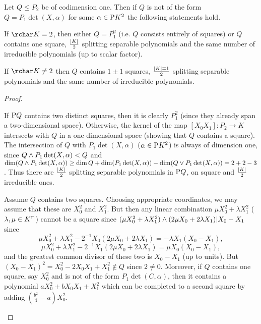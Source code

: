 \begin{lemma}
    Let $Q\leq P_2$ be of codimension one. Then if $Q$ is not of the form $Q=P_1\det(X,\alpha)$ for some $\alpha\in\P K^2$ the following statements hold.
    \begin{statements}
            \item If $\rchar K = 2$, then either $Q=P_1^2$ (i.e. $Q$ consists entirely of squares) or $Q$ contains one square, $\frac{\left\vert{K}\right\vert} 2$ splitting separable polynomials and the same number of irreducible polynomials (up to scalar factor).
        \item If $\rchar K \neq 2$ then $Q$ contains $1\pm 1$ squares, $\frac{\left\vert{K}\right\vert \mp 1} 2$ splitting separable polynomials and the same number of irreducible polynomials.
    \end{statements}
\end{lemma}

\begin{proof}
    \begin{statements}
            \item If $\P Q$ contains two distinct squares, then it is clearly $P_1^2$ (since they already span a two-dimensional space). Otherwise, the kernel of the map $[X_0X_1]:P_2\to K$ intersects with $Q$ in a one-dimensional space (showing that $Q$ contains a square). The intersection of $Q$ with $P_1\det(X,\alpha)$ ($\alpha\in \P K^2$) is always of dimension one, since $Q\wedge P_1\det(X,\alpha)<Q$ and $\dim (Q\wedge P_1\det(X,\alpha))\geq \dim Q+\dim (P_1\det(X,\alpha))-\dim (Q\vee P_1\det(X,\alpha))=2+2-3$. Thus there are $\frac{\left\vert{K}\right\vert} 2$ splitting separable polynomials in $\P Q$, on square and $\frac{\left\vert{K}\right\vert} 2$ irreducible ones.
            \item Assume $Q$ contains two squares. Choosing appropriate coordinates, we may assume that these are $X_0^2$ and $X_1^2$. But then any linear combination $\mu X_0^2+\lambda X_1^2$ ($\lambda,\mu\in\units K$) cannot be a square since $(\mu X_0^2+\lambda X_1^2)\wedge (2\mu X_0+2\lambda X_1)| X_0-X_1$ since
        $$
        \mu X_0^2+\lambda X_1^2-2^{-1}X_0(2\mu X_0+2\lambda X_1)=-\lambda X_1(X_0-X_1),
        $$
        $$
        \mu X_0^2+\lambda X_1^2-2^{-1}X_1(2\mu X_0+2\lambda X_1)=\mu X_0(X_0-X_1),
        $$
        and the greatest common divisor of these two is $X_0-X_1$ (up to units). But ${(X_0-X_1)}^2=X_0^2-2X_0X_1+X_1^2\not\in Q$ since $2\neq 0$.
        Moreover, if $Q$ contains one square, say $X_0^2$ and is not of the form $P_1\det(C,\alpha)$, then it contains a polynomial $aX_0^2+bX_0X_1+X_1^2$ which can be completed to a second square by adding $\left(\frac{b^2} 4 -a\right)X_0^2$.
    \end{statements}
\end{proof}

